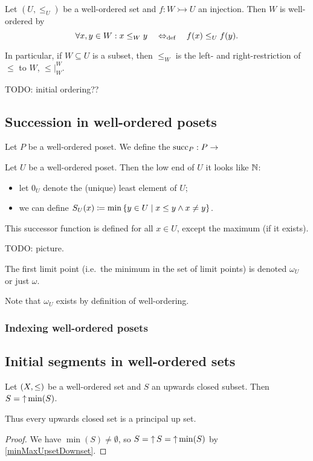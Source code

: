 \begin{lemma} \label{wellOrderingSubsets}
Let $(U,\leq_U)$ be a well-ordered set and $f: W \rightarrowtail U$ an injection. Then $W$ is well-ordered by
\[ \forall x,y\in W: x\leq_W y \quad\Leftrightarrow_{\text{def}}\quad f(x) \leq_U f(y). \]


In particular, if $W\subseteq U$ is a subset, then $\leq_W$ is the left- and right-restriction of $\leq$ to $W$, $\leq|_W^W$.
\end{lemma}
TODO: initial ordering??



\subsection{Succession in well-ordered posets}
\begin{definition}
Let $P$ be a well-ordered poset. We define the  $\operatorname{succ}_P: P\to $
\end{definition}

Let $U$ be a well-ordered poset. Then the low end of $U$ it looks like $\mathbb{N}$:
\begin{itemize}
\item let $0_U$ denote the (unique) least element of $U$;
\item we can define $S_U(x) \defeq \min\setbuilder{y\in U}{x\leq y \land x\neq y}$.
\end{itemize}
This successor function is defined for all $x\in U$, except the maximum (if it exists).

TODO: picture.

\begin{definition}
The first limit point (i.e.\ the minimum in the set of limit points) is denoted $\omega_U$ or just $\omega$.
\end{definition}
Note that $\omega_U$ exists by definition of well-ordering.


\subsubsection{Indexing well-ordered posets}


\subsection{Initial segments in well-ordered sets}
\begin{proposition}
Let $\sSet{X,\leq}$ be a well-ordered set and $S$ an upwards closed subset. Then $S = \operatorname{\uparrow}\min(S)$.

Thus every upwards closed set is a principal up set.
\end{proposition}
\begin{proof}
We have $\min(S) \neq\emptyset$, so $S = \operatorname{\uparrow} S = \operatorname{\uparrow}\min(S)$ by \ref{minMaxUpsetDownset}.
\end{proof}

